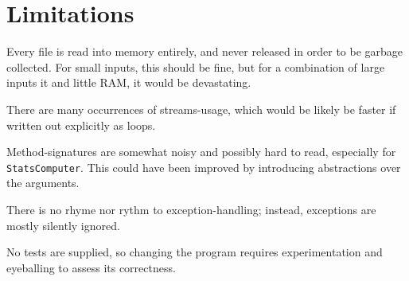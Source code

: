 \documentclass[a4paper,11pt]{article}
\begin{document}
\section{Limitations}

Every file is read into memory entirely, and never released in order
to be garbage collected.  For small inputs, this should be fine, but
for a combination of large inputs it and little RAM, it would be
devastating.

There are many occurrences of streams-usage, which would be likely be
faster if written out explicitly as loops.

Method-signatures are somewhat noisy and possibly hard to read,
especially for \texttt{StatsComputer}.  This could have been improved
by introducing abstractions over the arguments.

There is no rhyme nor rythm to exception-handling; instead, exceptions
are mostly silently ignored.

No tests are supplied, so changing the program requires
experimentation and eyeballing to assess its correctness.
\end{document}
